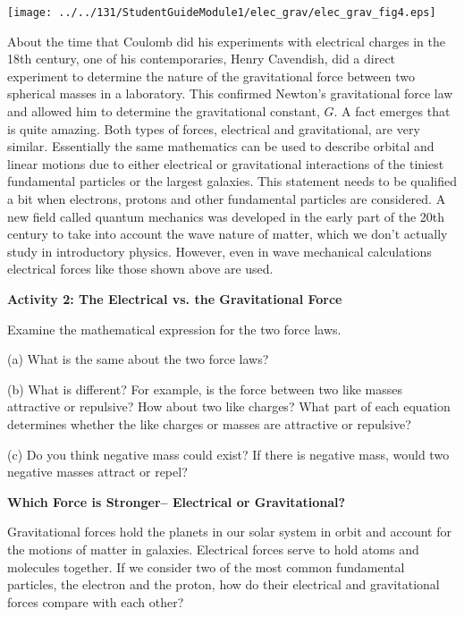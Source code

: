 \vspace{0.3cm}
{\par\centering \texttt{[image: ../../131/StudentGuideModule1/elec\_grav/elec\_grav\_fig4.eps]} \par}
\vspace{0.3cm}

About the time that Coulomb did his experiments with electrical charges in the
18th century, one of his contemporaries, Henry Cavendish, did a direct experiment
to determine the nature of the gravitational force between two spherical masses
in a laboratory. This confirmed Newton's gravitational force law and allowed
him to determine the gravitational constant, $G$. A fact emerges that is quite
amazing. Both types of forces, electrical and gravitational, are very similar.
Essentially the same mathematics can be used to describe orbital and linear
motions due to either electrical or gravitational interactions of the tiniest
fundamental particles or the largest galaxies. This statement needs to be qualified
a bit when electrons, protons and other fundamental particles are considered.
A new field called quantum mechanics was developed in the early part of the 20th
century to take into account the wave nature of matter, which we don't actually
study in introductory physics. However, even in wave mechanical calculations
electrical forces like those shown above are used. 

\textbf{Activity 2: The Electrical vs. the Gravitational Force} 

Examine the mathematical expression for the two force laws.

(a) What is the same about the two force laws?
\answerspace{20mm}

(b) What is different? For example, is the force between two like masses attractive
or repulsive? How about two like charges? What part of each equation determines
whether the like charges or masses are attractive or repulsive?
\answerspace{20mm}

(c) Do you think negative mass could exist? If there is negative mass, would
two negative masses attract or repel?
\answerspace{20mm}

\textbf{Which Force is Stronger-- Electrical or Gravitational?} 

Gravitational forces hold the planets in our solar system in orbit and account
for the motions of matter in galaxies. Electrical forces serve to hold atoms
and molecules together. If we consider two of the most common fundamental particles,
the electron and the proton, how do their electrical and gravitational forces
compare with each other?

